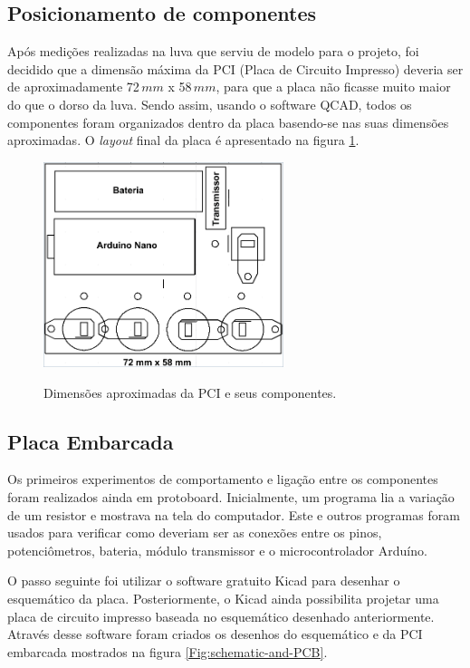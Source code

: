 \documentclass[
	12pt,				%
	openright,			%
	oneside,			%
	a4paper,			%
	english,			%
	brazil				%
	]{abntex2}
\begin{document}
			\subsection{Posicionamento de componentes}

			Após medições realizadas na luva que serviu de modelo para o projeto, foi decidido que a dimensão máxima da PCI (Placa de Circuito Impresso) deveria ser de aproximadamente 72$\,mm$ x 58$\,mm$, para que a placa não ficasse muito maior do que o dorso da luva. Sendo assim, usando o software QCAD, todos os componentes foram organizados dentro da placa basendo-se nas suas dimensões aproximadas. O \textit{layout} final da placa é apresentado na figura \ref{Fig:size-glove-module1}.

		\begin{figure}[h!]
			\centering
			\caption{Dimensões aproximadas da PCI e seus componentes.}
  		\includegraphics[width=7cm]{figures/size-glove-module1.png}
  		\label{Fig:size-glove-module1}
		\end{figure}


			\subsection{Placa Embarcada}

			Os primeiros experimentos de comportamento e ligação entre os componentes foram realizados ainda em protoboard. Inicialmente, um programa lia a variação de um resistor e mostrava na tela do computador. Este e outros programas foram usados para verificar como deveriam ser as conexões entre os pinos, potenciômetros, bateria, módulo transmissor e o microcontrolador Arduíno.

			O passo seguinte foi utilizar o software gratuito Kicad para desenhar o esquemático da placa. Posteriormente, o Kicad ainda possibilita projetar uma placa de circuito impresso baseada no esquemático desenhado anteriormente. Através desse software foram criados os desenhos do esquemático e da PCI embarcada mostrados na figura \ref{Fig:schematic-and-PCB}.
\end{document}
